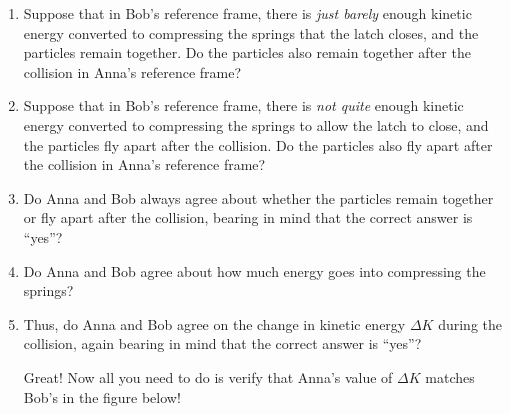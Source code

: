 \begin{enumerate}[labparts]

\item Suppose that in Bob's reference frame, there is \textit{just barely} enough kinetic energy converted to compressing the springs that the latch closes, and the particles remain together.  Do the particles also remain together after the collision in Anna's reference frame?
\answerspace{0.2in}

\item Suppose that in Bob's reference frame, there is \textit{not quite} enough kinetic energy converted to compressing the springs to allow the latch to close, and the particles fly apart after the collision.  Do the particles also fly apart after the collision in Anna's reference frame?
\answerspace{0.2in}

\item Do Anna and Bob always agree about whether the particles remain together or fly apart after the collision, bearing in mind that the correct answer is ``yes''?
\answerspace{0.2in}

\item Do Anna and Bob agree about how much energy goes into compressing the springs?
\answerspace{0.2in}

\item Thus, do Anna and Bob agree on the change in kinetic energy $\Delta K$ during the collision, again bearing in mind that the correct answer is ``yes''?
\label{part_Anna_and_Bob_must_agree}
\answerspace{0.2in}

Great!  Now all you need to do is verify that Anna's value of $\Delta K$ matches Bob's in the figure below!


\end{enumerate}
